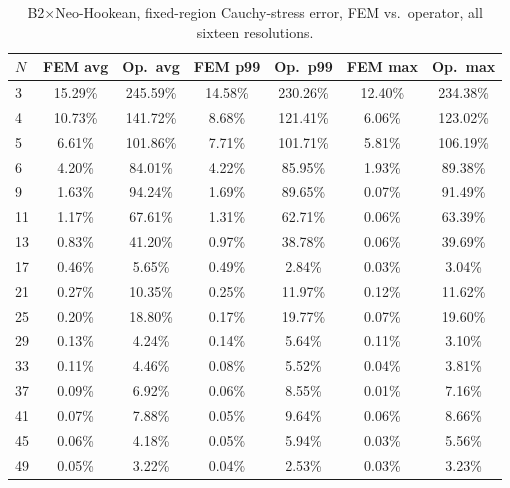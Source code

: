 \documentclass[final,5p,times]{elsarticle}
\begin{document}
\begin{table}[ht]
\centering
\caption{B2$\times$Neo-Hookean, fixed-region Cauchy-stress error, FEM
  vs.\ operator, all sixteen resolutions.}
\label{tab:b1-b2nh-b}
\scriptsize
\begin{tabular}{lcccccc}
\toprule
$N$ & FEM avg & Op.\ avg & FEM p99 & Op.\ p99 & FEM max & Op.\ max \\
\midrule
3  & 15.29\% & 245.59\% & 14.58\% & 230.26\% & 12.40\% & 234.38\% \\
4  & 10.73\% & 141.72\% & 8.68\%  & 121.41\% & 6.06\%  & 123.02\% \\
5  & 6.61\%  & 101.86\% & 7.71\%  & 101.71\% & 5.81\%  & 106.19\% \\
6  & 4.20\%  & 84.01\%  & 4.22\%  & 85.95\%  & 1.93\%  & 89.38\%  \\
9  & 1.63\%  & 94.24\%  & 1.69\%  & 89.65\%  & 0.07\%  & 91.49\%  \\
11 & 1.17\%  & 67.61\%  & 1.31\%  & 62.71\%  & 0.06\%  & 63.39\%  \\
13 & 0.83\%  & 41.20\%  & 0.97\%  & 38.78\%  & 0.06\%  & 39.69\%  \\
17 & 0.46\%  & 5.65\%   & 0.49\%  & 2.84\%   & 0.03\%  & 3.04\%   \\
21 & 0.27\%  & 10.35\%  & 0.25\%  & 11.97\%  & 0.12\%  & 11.62\%  \\
25 & 0.20\%  & 18.80\%  & 0.17\%  & 19.77\%  & 0.07\%  & 19.60\%  \\
29 & 0.13\%  & 4.24\%   & 0.14\%  & 5.64\%   & 0.11\%  & 3.10\%   \\
33 & 0.11\%  & 4.46\%   & 0.08\%  & 5.52\%   & 0.04\%  & 3.81\%   \\
37 & 0.09\%  & 6.92\%   & 0.06\%  & 8.55\%   & 0.01\%  & 7.16\%   \\
41 & 0.07\%  & 7.88\%   & 0.05\%  & 9.64\%   & 0.06\%  & 8.66\%   \\
45 & 0.06\%  & 4.18\%   & 0.05\%  & 5.94\%   & 0.03\%  & 5.56\%   \\
49 & 0.05\%  & 3.22\%   & 0.04\%  & 2.53\%   & 0.03\%  & 3.23\%   \\
\bottomrule
\end{tabular}
\end{table}
\end{document}
